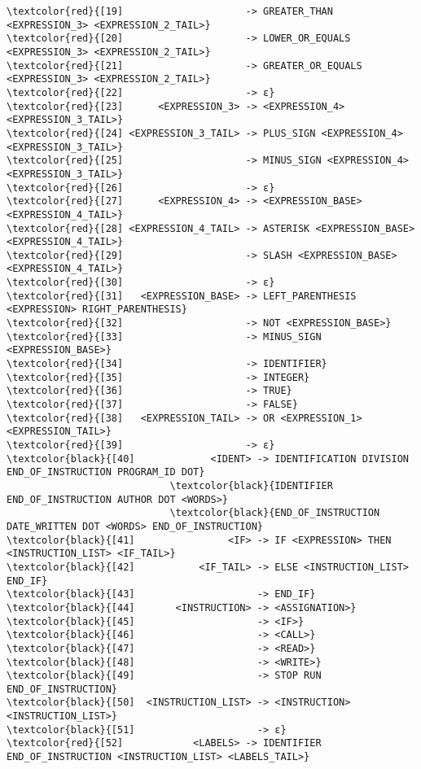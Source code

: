 \begin{Verbatim}[commandchars=\\\{\}]
\textcolor{red}{[19]                     -> GREATER_THAN <EXPRESSION_3> <EXPRESSION_2_TAIL>}
\textcolor{red}{[20]                     -> LOWER_OR_EQUALS <EXPRESSION_3> <EXPRESSION_2_TAIL>}
\textcolor{red}{[21]                     -> GREATER_OR_EQUALS <EXPRESSION_3> <EXPRESSION_2_TAIL>}
\textcolor{red}{[22]                     -> ε}
\textcolor{red}{[23]      <EXPRESSION_3> -> <EXPRESSION_4> <EXPRESSION_3_TAIL>}
\textcolor{red}{[24] <EXPRESSION_3_TAIL> -> PLUS_SIGN <EXPRESSION_4> <EXPRESSION_3_TAIL>}
\textcolor{red}{[25]                     -> MINUS_SIGN <EXPRESSION_4> <EXPRESSION_3_TAIL>}
\textcolor{red}{[26]                     -> ε}
\textcolor{red}{[27]      <EXPRESSION_4> -> <EXPRESSION_BASE> <EXPRESSION_4_TAIL>}
\textcolor{red}{[28] <EXPRESSION_4_TAIL> -> ASTERISK <EXPRESSION_BASE> <EXPRESSION_4_TAIL>}
\textcolor{red}{[29]                     -> SLASH <EXPRESSION_BASE> <EXPRESSION_4_TAIL>}
\textcolor{red}{[30]                     -> ε}
\textcolor{red}{[31]   <EXPRESSION_BASE> -> LEFT_PARENTHESIS <EXPRESSION> RIGHT_PARENTHESIS}
\textcolor{red}{[32]                     -> NOT <EXPRESSION_BASE>}
\textcolor{red}{[33]                     -> MINUS_SIGN <EXPRESSION_BASE>}
\textcolor{red}{[34]                     -> IDENTIFIER}
\textcolor{red}{[35]                     -> INTEGER}
\textcolor{red}{[36]                     -> TRUE}
\textcolor{red}{[37]                     -> FALSE}
\textcolor{red}{[38]   <EXPRESSION_TAIL> -> OR <EXPRESSION_1> <EXPRESSION_TAIL>}
\textcolor{red}{[39]                     -> ε}
\textcolor{black}{[40]             <IDENT> -> IDENTIFICATION DIVISION END_OF_INSTRUCTION PROGRAM_ID DOT}
                            \textcolor{black}{IDENTIFIER END_OF_INSTRUCTION AUTHOR DOT <WORDS>}
                            \textcolor{black}{END_OF_INSTRUCTION DATE_WRITTEN DOT <WORDS> END_OF_INSTRUCTION}
\textcolor{black}{[41]                <IF> -> IF <EXPRESSION> THEN <INSTRUCTION_LIST> <IF_TAIL>}
\textcolor{black}{[42]           <IF_TAIL> -> ELSE <INSTRUCTION_LIST> END_IF}
\textcolor{black}{[43]                     -> END_IF}
\textcolor{black}{[44]       <INSTRUCTION> -> <ASSIGNATION>}
\textcolor{black}{[45]                     -> <IF>}
\textcolor{black}{[46]                     -> <CALL>}
\textcolor{black}{[47]                     -> <READ>}
\textcolor{black}{[48]                     -> <WRITE>}
\textcolor{black}{[49]                     -> STOP RUN END_OF_INSTRUCTION}
\textcolor{black}{[50]  <INSTRUCTION_LIST> -> <INSTRUCTION> <INSTRUCTION_LIST>}
\textcolor{black}{[51]                     -> ε}
\textcolor{red}{[52]            <LABELS> -> IDENTIFIER END_OF_INSTRUCTION <INSTRUCTION_LIST> <LABELS_TAIL>}

\end{Verbatim}
